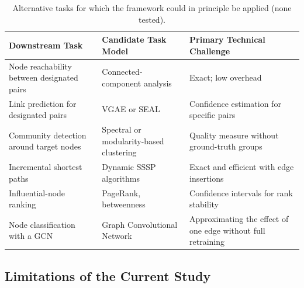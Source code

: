 \documentclass[11pt,a4paper]{article}
\begin{document}
\begin{table}[htbp]
\centering
\caption{Alternative tasks for which the framework could in principle be applied (none tested).}
\label{tab:generality}
\small
\begin{tabularx}{\textwidth}{>{\raggedright\arraybackslash}p{3.6cm}>{\raggedright\arraybackslash}p{4.0cm}X}
\toprule
Downstream Task & Candidate Task Model & Primary Technical Challenge\\
\midrule
Node reachability between designated pairs & Connected-component analysis & Exact; low overhead\\
Link prediction for designated pairs & VGAE or SEAL & Confidence estimation for specific pairs\\
Community detection around target nodes & Spectral or modularity-based clustering & Quality measure without ground-truth groups\\
Incremental shortest paths & Dynamic SSSP algorithms & Exact and efficient with edge insertions\\
Influential-node ranking & PageRank, betweenness & Confidence intervals for rank stability\\
Node classification with a GCN~\cite{kipf} & Graph Convolutional Network & Approximating the effect of one edge without full retraining\\
\bottomrule
\end{tabularx}
\end{table}

\subsection{Limitations of the Current Study}
\end{document}
